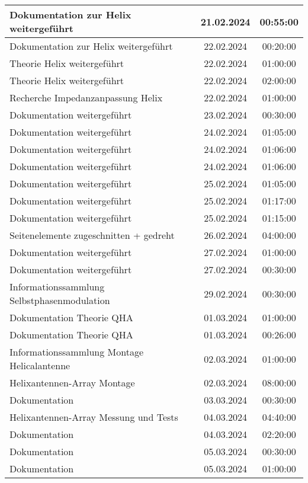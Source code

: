 \begin{longtable}{|l|c|c|}
	\hline
	Dokumentation zur Helix weitergeführt & 21.02.2024 & 00:55:00 \\
	\hline
	Dokumentation zur Helix weitergeführt & 22.02.2024 & 00:20:00 \\
	\hline
	Theorie Helix weitergeführt & 22.02.2024 & 01:00:00 \\
	\hline
	Theorie Helix weitergeführt & 22.02.2024 & 02:00:00 \\
	\hline
	Recherche Impedanzanpassung Helix & 22.02.2024 & 01:00:00 \\
	\hline
	Dokumentation weitergeführt & 23.02.2024 & 00:30:00 \\
	\hline
	Dokumentation weitergeführt & 24.02.2024 & 01:05:00 \\
	\hline
	Dokumentation weitergeführt & 24.02.2024 & 01:06:00 \\
	\hline
	Dokumentation weitergeführt & 24.02.2024 & 01:06:00 \\
	\hline
	Dokumentation weitergeführt & 25.02.2024 & 01:05:00 \\
	\hline
	Dokumentation weitergeführt & 25.02.2024 & 01:17:00 \\
	\hline
	Dokumentation weitergeführt & 25.02.2024 & 01:15:00 \\
	\hline
	Seitenelemente zugeschnitten + gedreht & 26.02.2024 & 04:00:00 \\
	\hline
	Dokumentation weitergeführt & 27.02.2024 & 01:00:00 \\
	\hline
	Dokumentation weitergeführt & 27.02.2024 & 00:30:00 \\
	\hline
	Informationssammlung Selbstphasenmodulation & 29.02.2024 & 00:30:00 \\
	\hline
	Dokumentation Theorie QHA & 01.03.2024 & 01:00:00 \\
	\hline
	Dokumentation Theorie QHA & 01.03.2024 & 00:26:00 \\
	\hline
	Informationssammlung Montage Helicalantenne & 02.03.2024 & 01:00:00 \\
	\hline
	Helixantennen-Array Montage & 02.03.2024 & 08:00:00 \\
	\hline
	Dokumentation & 03.03.2024 & 00:30:00 \\
	\hline
	Helixantennen-Array Messung und Tests & 04.03.2024 & 04:40:00 \\
	\hline
	Dokumentation & 04.03.2024 & 02:20:00 \\
	\hline
	Dokumentation & 05.03.2024 & 00:30:00 \\
	\hline
	Dokumentation & 05.03.2024 & 01:00:00 \\

\end{longtable}
